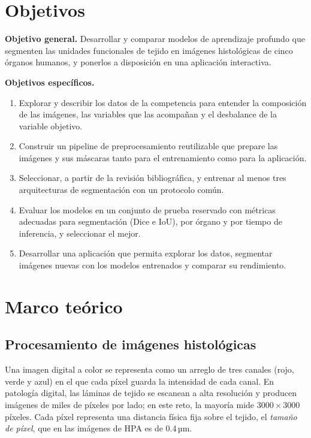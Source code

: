 \documentclass[11pt,letterpaper]{article}
\begin{document}
\section{Objetivos}\label{sec:objetivos}

\textbf{Objetivo general.} Desarrollar y comparar modelos de aprendizaje profundo que segmenten las
unidades funcionales de tejido en imágenes histológicas de cinco órganos humanos, y ponerlos a
disposición en una aplicación interactiva.

\textbf{Objetivos específicos.}
\begin{enumerate}
  \item Explorar y describir los datos de la competencia para entender la composición de las
        imágenes, las variables que las acompañan y el desbalance de la variable objetivo.
  \item Construir un pipeline de preprocesamiento reutilizable que prepare las imágenes y sus
        máscaras tanto para el entrenamiento como para la aplicación.
  \item Seleccionar, a partir de la revisión bibliográfica, y entrenar al menos tres arquitecturas
        de segmentación con un protocolo común.
  \item Evaluar los modelos en un conjunto de prueba reservado con métricas adecuadas para
        segmentación (Dice e IoU), por órgano y por tiempo de inferencia, y seleccionar el mejor.
  \item Desarrollar una aplicación que permita explorar los datos, segmentar imágenes nuevas con los
        modelos entrenados y comparar su rendimiento.
\end{enumerate}

\section{Marco teórico}\label{sec:marco}

\subsection{Procesamiento de imágenes histológicas}

Una imagen digital a color se representa como un arreglo de tres canales (rojo, verde y azul) en el
que cada píxel guarda la intensidad de cada canal. En patología digital, las láminas de tejido se
escanean a alta resolución y producen imágenes de miles de píxeles por lado; en este reto, la
mayoría mide $3000 \times 3000$ píxeles. Cada píxel representa una distancia física fija sobre el
tejido, el \emph{tamaño de píxel}, que en las imágenes de HPA es de 0.4\,µm.
\end{document}
